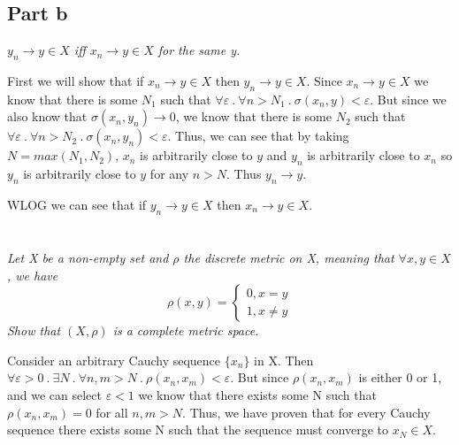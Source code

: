 \documentclass[]{article}
\begin{document}
		\subsection*{Part b}
		\textit{$y_n \to y \in X$ iff $x_n \to y \in X$ for the same y. }

		First we will show that if $x_n \to y \in X$ then $y_n \to y \in X$. Since $x_n \to y \in X$ we know that there is some $N_1$ such that $\forall \varepsilon\ .\ \forall n > N_1\ .\ \sigma(x_n, y) < \varepsilon$. But since we also know that $\sigma(x_n, y_n) \to 0$, we know that there is some $N_2$ such that $\forall \varepsilon\ .\ \forall n > N_2\ .\ \sigma(x_n, y_n) < \varepsilon$. Thus, we can see that by taking $N = max(N_1, N_2)$, $x_n$ is arbitrarily close to $y$ and $y_n$ is arbitrarily close to $x_n$ so $y_n$ is arbitrarily close to $y$ for any $n > N$. Thus $y_n \to y$.  

		WLOG we can see that if $y_n \to y \in X$ then $x_n \to y \in X$. 

	\section{}
		\textit{Let X be a non-empty set and $\rho$ the discrete metric on X, meaning that $\forall x, y \in X$, we have 
		\[
		\rho(x, y) = \begin{cases}
			0, x = y \\
			1, x \neq y
		\end{cases}
		\] 
		Show that $(X, \rho)$ is a complete metric space.}

		Consider an arbitrary Cauchy sequence $\{x_n\}$ in X. Then $\forall \varepsilon > 0\ .\ \exists N\ .\ \forall n, m > N\ .\ \rho(x_n, x_m) < \varepsilon$. But since $\rho(x_n, x_m)$ is either 0 or 1, and we can select $\varepsilon < 1$ we know that there exists some N such that $\rho(x_n, x_m) = 0$ for all $n, m > N$. Thus, we have proven that for every Cauchy sequence there exists some N such that the sequence must converge to $x_N \in X$.
\end{document}
